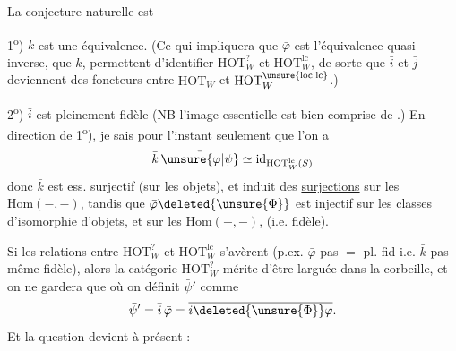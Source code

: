 La conjecture naturelle est

1\textsuperscript{o}) $\bar k$ est une équivalence. (Ce qui impliquera que $\bar\varphi$ est l'équivalence quasi-inverse\unsure{)}, que  $\bar k$, \inserted{$\bar\varphi$} permettent  d'identifier $\mathrm{HOT}^{?}_W$ et $\mathrm{HOT}^{\mathrm{lc}}_W$, de sorte que $\bar i$ et $\bar j$ deviennent des foncteurs entre $\mathrm{HOT}_W$ et $\mathrm{HOT}^{\unsure{\mathrm{loc}|\mathrm{lc}}}_W$.)

2\textsuperscript{o}) $\bar i$ est pleinement fidèle (NB l'image essentielle est bien comprise de .)
En direction de 1\textsuperscript{o}), je sais pour l'instant seulement que l'on a
\[
 \bar k\,\bar{\unsure{\varphi|\psi}}\simeq\mathrm{id}_{\mathrm{HOT}^{\mathrm{lc}}_W(S)}
\]
donc $\bar k$ est ess. surjectif (sur les  objets), et induit des \uline{surjections} sur les $\mathrm{Hom}(-,-)$, tandis que $\bar\varphi\deleted{\unsure{\Phi}}$ est injectif sur les classes d'isomorphie d'objets, et sur les $\mathrm{Hom}(-,-)$,  (i.e. \uline{fidèle}).

Si les relations entre $\mathrm{HOT}^{?}_W$ et $\mathrm{HOT}^{\mathrm{lc}}_W$ s'avèrent  (p.ex. $\bar\varphi$ pas $=$ pl. fid i.e. $\bar k$ pas même fidèle), alors la catégorie $\mathrm{HOT}^{?}_W$ mérite d'être larguée dans la corbeille, et on ne gardera que
où on définit $\bar\psi'$ comme
\[
 \bar\psi'=\bar i\,\bar\varphi=\overline{i\deleted{\unsure{\Phi}}\varphi}.
\]
Et la question  devient à présent :

